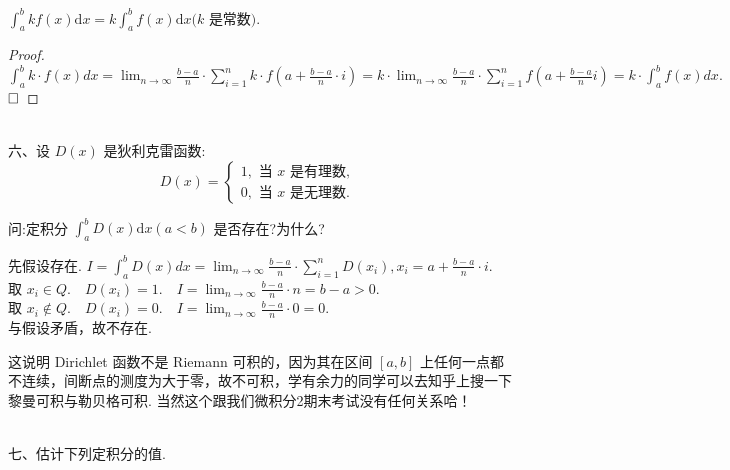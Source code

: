 \documentclass[lang=cn,newtx,10pt,scheme=chinese]{elegantbook}
\begin{document}
$\displaystyle\int_a^b k f(x) \mathrm{d} x=k \int_a^b f(x) \mathrm{d} x(k \text { 是常数). } $\\

\begin{proof}
	$\displaystyle \int_a^b k \cdot f(x) d x=\lim _{n \rightarrow \infty} \frac{b-a}{n} \cdot \sum_{i=1}^n k \cdot f\left(a+\frac{b-a}{n} \cdot i\right) 
	=k \cdot \lim _{n \rightarrow \infty} \frac{b-a}{n} \cdot \sum_{i=1}^n f\left(a+\frac{b-a}{n} i\right)=k \cdot \displaystyle\int_a^b f(x) d x.$$\hfill\square$
\end{proof}

~\\
六、设 $D(x)$ 是狄利克雷函数:\\
$$
D(x)=\left\{\begin{array}{l}
	1, \text { 当 } x \text { 是有理数, } \\
	0, \text { 当 } x \text { 是无理数. }
\end{array}\right.
$$

问:定积分 $\displaystyle\int_a^b D(x) \mathrm{d} x(a<b)$ 是否存在?为什么?\\
\begin{solution}
	先假设存在. $I=\displaystyle\int_a^b D(x) d x=\lim _{n \rightarrow \infty} \frac{b-a}{n} \cdot \sum_{i=1}^n D\left(x_i\right), x_i=a+\frac{b-a}{n} \cdot i.
	$\\
 取 $x_i \displaystyle\in Q . \quad D\left(x_i\right)=1 . \quad I=\lim _{n \rightarrow \infty} \frac{b-a}{n} \cdot n=b-a>0$.\\
 取 $x_i \displaystyle\notin Q . \quad D\left(x_i\right)=0 . \quad I=\lim _{n \rightarrow \infty} \frac{b-a}{n} \cdot 0=0$.\\
与假设矛盾，故不存在.

\begin{remark}
	\color{blue} 这说明 Dirichlet 函数不是 Riemann 可积的，因为其在区间 $[a,b]$ 上任何一点都不连续，间断点的测度为大于零，故不可积，学有余力的同学可以去知乎上搜一下黎曼可积与勒贝格可积. 当然这个跟我们微积分2期末考试没有任何关系哈！
\end{remark}

\end{solution}
~\\
七、估计下列定积分的值.\\
\end{document}
